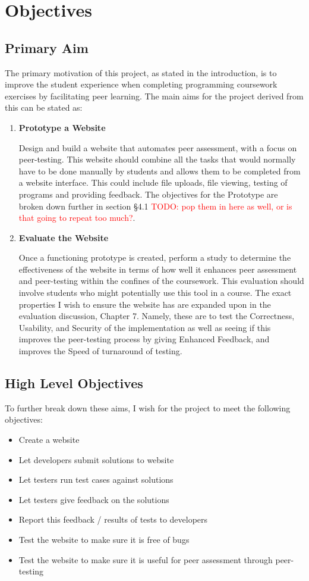 \documentclass[a4paper,11pt]{report}
\newcommand{\todo}[1]{\textcolor{red}{TODO: #1}}
\begin{document}
\chapter{Objectives}
\section{Primary Aim}
The primary motivation of this project, as stated in the introduction, is to improve the student experience when completing programming coursework exercises by facilitating peer learning. The main aims for the project derived from this can be stated as:
\begin{enumerate}
\item \textbf{Prototype a Website}\par
Design and build a website that automates peer assessment, with a focus on peer-testing. This website should combine all the tasks that would normally have to be done manually by students and allows them to be completed from a website interface. This could include file uploads, file viewing, testing of programs and providing feedback. The objectives for the Prototype are broken down further in section \S4.1 \todo{pop them in here as well, or is that going to repeat too much?}.
\item \textbf{Evaluate the Website}\par
\label{sec:aimeval}
Once a functioning prototype is created, perform a study to determine the effectiveness of the website in terms of how well it enhances peer assessment and peer-testing within the confines of the coursework. This evaluation should involve students who might potentially use this tool in a course. The exact properties I wish to ensure the website has are expanded upon in the evaluation discussion, Chapter 7. Namely, these are to test the Correctness, Usability, and Security of the implementation as well as seeing if this improves the peer-testing process by giving Enhanced Feedback, and improves the Speed of turnaround of testing.
\end{enumerate}

\section{High Level Objectives}
To further break down these aims, I wish for the project to meet the following objectives:
\begin{itemize}
\item Create a website
\item Let developers submit solutions to website
\item Let testers run test cases against solutions
\item Let testers give feedback on the solutions
\item Report this feedback / results of tests to developers
\item Test the website to make sure it is free of bugs
\item Test the website to make sure it is useful for peer assessment through peer-testing
\end{itemize}
\end{document}
